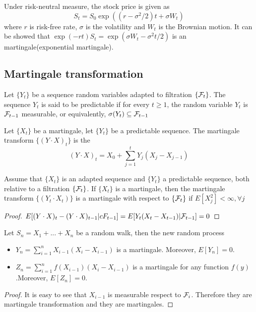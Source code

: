 \begin{refsection}
\begin{example}
Under risk-neutral measure, the stock price is given as
$$S_t = S_0 \exp((r-\sigma^2/2)t + \sigma W_t)$$
where $r$ is risk-free rate, $\sigma$ is the volatility and $W_t$ is the Brownian motion. 
It can be showed that $\exp(-rt)S_t = \exp(\sigma W_t -\sigma^2 t/2)$ is an martingale(exponential martingale).
\end{example}



\subsection{Martingale transformation}
\begin{definition}
Let $\{Y_t\}$ be a sequence random variables adapted to filtration $\{\mathcal{F}_t\}$. The sequence $Y_t$ is said to be predictable if for every $t\geq 1$, the random variable $Y_t$ is $\mathcal{F}_{t-1}$ measurable, or equivalently, $\sigma(Y_{t})\subseteq \mathcal{F}_{t-1}$
\end{definition}

\begin{definition}\cite[83]{mikosch1998elementary}
Let $\{X_t\}$ be a martingale, let $\{Y_t\}$ be a predictable sequence. The martingale transform $\{(Y\cdot X)_t\}$ is the 
$$(Y\cdot X)_t = X_0 + \sum_{j=1}^{t} Y_j (X_{j}-X_{j-1})$$
\end{definition}

\begin{lemma}\label{ch:theory-of-stochastic-process:th:martingaletransform}
Assume that $\{X_t\}$ is an adapted sequence and $\{Y_t\}$ a predictable sequence, both relative to a filtration $\{\mathcal{F}_t\}$. If $\{X_t\}$ is a martingale, then the martingale transform $\{(Y_t\cdot X_t)\}$ is a martingale with respect to $\{\mathcal{F}_t\}$ if $E[X^2_j] < \infty,\forall j$
\end{lemma}
\begin{proof}
$E[(Y\cdot X)_t - (Y\cdot X)_{t-1}|cF_{t-1}] = E[Y_{t}(X_{t}-X_{t-1})|\mathcal{F}_{t-1}] = 0$
\end{proof}

\begin{lemma}
Let $S_n = X_1 + ... + X_n$ be a random walk, then the new random process
\begin{itemize}
	\item $Y_n = \sum_{i=1}^n X_{i-1}(X_i-X_{i-1})$ is a martingale. Moreover, $E[Y_n] = 0$.
	\item $Z_n = \sum_{i=1}^n f(X_{i-1})(X_i-X_{i-1})$ is a martingale for any function $f(y)$.Moreover, $E[Z_n] = 0$.
\end{itemize}
\end{lemma}
\begin{proof}
	It is easy to see that $X_{i-1}$ is measurable respect to $\mathcal{F}_i$. Therefore they are martingale transformation and they are martingales. 
\end{proof}



\end{refsection}
